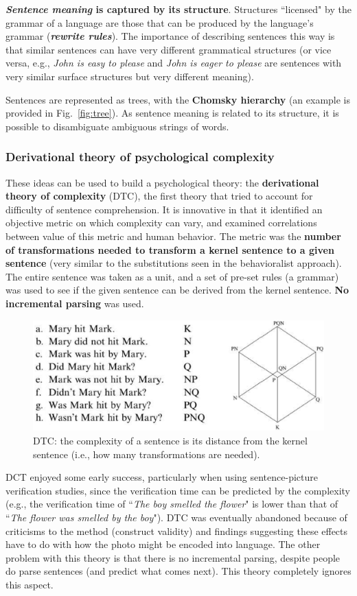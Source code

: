 \textbf{\textit{Sentence meaning} is captured by its structure}. Structures ``licensed" by the grammar of a language are those that can be produced by the language's grammar (\textbf{\textit{rewrite rules}}). The importance of describing sentences this way is that similar sentences can have very different grammatical structures (or vice versa, e.g., \textit{John is easy to please} and \textit{John is eager to please} are sentences with very similar surface structures but very different meaning).

Sentences are represented as trees, with the \textbf{Chomsky hierarchy} (an example is provided in Fig.~\ref{fig:tree}). As sentence meaning is related to its structure, it is possible to disambiguate ambiguous strings of words.

\subsubsection{Derivational theory of psychological complexity}
These ideas can be used to build a psychological theory: the \textbf{derivational theory of complexity} (DTC), the first theory that tried to account for difficulty of sentence comprehension. It is innovative in that it identified an objective metric on which complexity can vary, and examined correlations between value of this metric and human behavior. The metric was the \textbf{number of transformations needed to transform a kernel sentence to a given sentence} (very similar to the substitutions seen in the behavioralist approach). The entire sentence was taken as a unit, and a set of pre-set rules (a grammar) was used to see if the given sentence can be derived from the kernel sentence. \textbf{No incremental parsing} was used.

\begin{figure}[!ht]
    \centering
    \captionsetup{width=.8\linewidth}
    \includegraphics[width=0.5\linewidth]{images/dtc.png}
    \caption*{DTC: the complexity of a sentence is its distance from the kernel sentence (i.e., how many transformations are needed).}
    \label{fig:dtc}
\end{figure}

DCT enjoyed some early success, particularly when using sentence-picture verification studies, since the verification time can be predicted by the complexity (e.g., the verification time of ``\textit{The boy smelled the flower}" is lower than that of ``\textit{The flower was smelled by the boy}").
DTC was eventually abandoned because of criticisms to the method (construct validity) and findings suggesting these effects have to do with how the photo might be encoded into language. The other problem with this theory is that there is no incremental parsing, despite people do parse sentences (and predict what comes next). This theory completely ignores this aspect.

